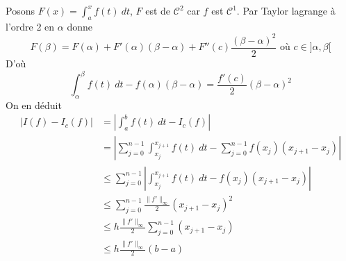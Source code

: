\begin{preuve}
    Posons $F(x) = \int_{{a}}^{{x}} {f(t)} \: d{t}$, $F$ est de  $\mathcal{C}^2$ car $f$ est  $\mathcal{C}^1$. Par Taylor lagrange à l'ordre 2 en $\alpha$ donne
     \[
         F(\beta) = F(\alpha) + F'(\alpha)(\beta - \alpha) + F''(c) \frac{(\beta - \alpha)^2}{2} \text{ où } c \in ]\alpha, \beta[
    \] 
    D'où
    \[
        \int_{{\alpha}}^{{\beta}} {f(t)} \: d{t} - f(\alpha)(\beta - \alpha) = \frac{f'(c)}{2}(\beta - \alpha)^2
    \] 
    On en déduit
    \begin{align*}
        \left| I(f) - I_c(f) \right| &= \left| \int_{{a}}^{{b}} {f(t)} \: d{t} - I_c(f) \right| \\
                                     &= \left| \sum_{j=0}^{n-1} \int_{{x_j}}^{{x_{j+1}}} {f(t)} \: d{t} - \sum_{j=0}^{n-1} f(x_j)(x_{j+1} - x_{j}) \right| \\
                                     &\le \sum_{j=0}^{n-1} \left| \int_{{x_j}}^{{x_{j+1}}} {f(t)} \: d{t} - f(x_j)(x_{j+1} - x_{j}) \right| \\
                                     &\le \sum_{j=0}^{n-1} \frac{\|f'\|_{\infty}}{2}(x_{j+1} - x_{j})^2\\
                                     &\le h \frac{\|f'\|_{\infty}}{2}\sum_{j=0}^{n-1} (x_{j+1} - x_{j})\\
                                     &\le h \frac{\|f'\|_{\infty}}{2}(b - a)
    \end{align*}
\end{preuve}

